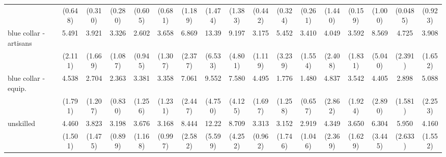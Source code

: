 {\begin{tabular}{l*{16}{c}}
                    &     (0.648)         &     (0.310)         &     (0.280)         &     (0.605)         &     (0.681)         &     (1.189)         &     (1.474)         &     (1.383)         &     (0.442)         &     (0.324)         &     (0.261)         &     (1.440)         &     (0.159)         &     (1.000)         &    (0.0485)         &     (0.923)         \\
[1em]
blue collar - artisans&       5.491\sym{***}&       3.921\sym{**} &       3.326\sym{***}&       2.602\sym{**} &       3.658\sym{***}&       6.869\sym{***}&       13.39\sym{***}&       9.197\sym{***}&       3.175\sym{**} &       5.452\sym{**} &       3.410\sym{**} &       4.049\sym{*}  &       3.592\sym{*}  &       8.569\sym{***}&       4.725\sym{**} &       3.908\sym{**} \\
                    &     (2.111)         &     (1.669)         &     (1.087)         &     (0.945)         &     (1.307)         &     (2.377)         &     (6.533)         &     (4.801)         &     (1.119)         &     (3.239)         &     (1.554)         &     (2.408)         &     (1.831)         &     (5.040)         &     (2.391)         &     (1.652)         \\
[1em]
blue collar - equip.&       4.538\sym{***}&       2.704\sym{*}  &       2.363\sym{*}  &       3.381\sym{**} &       3.358\sym{***}&       7.061\sym{***}&       9.552\sym{***}&       7.580\sym{***}&       4.495\sym{***}&       1.776         &       1.480         &       4.837\sym{**} &       3.542\sym{*}  &       4.405\sym{*}  &       2.898         &       5.088\sym{***}\\
                    &     (1.791)         &     (1.207)         &     (0.830)         &     (1.256)         &     (1.231)         &     (2.447)         &     (4.750)         &     (4.125)         &     (1.697)         &     (1.258)         &     (0.657)         &     (2.862)         &     (1.924)         &     (2.890)         &     (1.581)         &     (2.253)         \\
[1em]
unskilled           &       4.460\sym{***}&       3.823\sym{***}&       3.198\sym{***}&       3.676\sym{***}&       3.168\sym{***}&       8.444\sym{***}&       12.22\sym{***}&       8.709\sym{***}&       3.313\sym{***}&       3.152\sym{*}  &       2.919\sym{**} &       4.349\sym{**} &       3.650\sym{**} &       6.304\sym{***}&       5.950\sym{***}&       4.160\sym{***}\\
                    &     (1.501)         &     (1.475)         &     (0.899)         &     (1.168)         &     (0.997)         &     (2.582)         &     (5.599)         &     (4.252)         &     (0.962)         &     (1.746)         &     (1.046)         &     (2.369)         &     (1.629)         &     (3.445)         &     (2.633)         &     (1.552)         \\

\end{tabular}}
